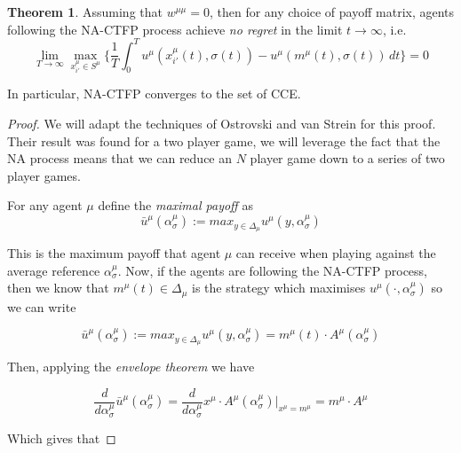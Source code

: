 \documentclass{article}
\theoremstyle{definition}
\newtheorem{theorem}{Theorem}
\begin{document}
  \begin{theorem}
    Assuming that $w^{\mu \mu} = 0$, then for any choice of payoff matrix, agents following the
    NA-CTFP process achieve \emph{no regret} in the limit $t \rightarrow \infty$, i.e.
    \begin{equation}
      \lim_{T \rightarrow \infty} \max_{x_{i'}^\mu \in S^\mu} \Big\{ \frac{1}{T} \int_{0}^{T} u^{\mu}(x_{i'}^\mu(t), \sigma(t)) - u^{\mu}(m^\mu(t), \sigma(t)) \, dt \Big\} = 0
    \end{equation}

    In particular, NA-CTFP converges to the set of CCE.

  \end{theorem}
  
  \begin{proof}
    We will adapt the techniques of Ostrovski and van Strein for this proof. Their result was found for a two player game, we will leverage the fact that the NA process means that we can reduce an $N$ player game down to a series of two player games. 
     
    For any agent $\mu$ define the \emph{maximal payoff} as 
    \begin{equation}
      \bar{u}^\mu (\alpha_\sigma^\mu) := max_{y \in \Delta_\mu} u^\mu(y, \alpha_\sigma^\mu)
    \end{equation}

    This is the maximum payoff that agent $\mu$ can receive when playing against the average reference $\alpha_{\sigma}^\mu$. Now, if the agents are following the NA-CTFP process, then we know that $m^\mu (t) \in \Delta_\mu$ is the strategy which maximises $u^\mu( \cdot, \alpha_\sigma^\mu)$ so we can write 

    \begin{equation}
      \bar{u}^\mu (\alpha_\sigma^\mu) := max_{y \in \Delta_\mu} u^\mu(y, \alpha_\sigma^\mu) = m^\mu(t) \cdot A^\mu (\alpha_\sigma^\mu)
    \end{equation}

    Then, applying the \emph{envelope theorem} \cite{MathematicalEconomics} we have

    \begin{equation}
      \frac{d}{d \alpha_\sigma^\mu} \bar{u}^\mu (\alpha_\sigma^\mu) = \frac{d}{d \alpha_\sigma^\mu} x^\mu \cdot A^\mu (\alpha_\sigma^\mu) \Big |_{x^\mu = m^\mu} = m^\mu \cdot A^\mu
    \end{equation}

    Which gives that 


\end{proof}
\end{document}
